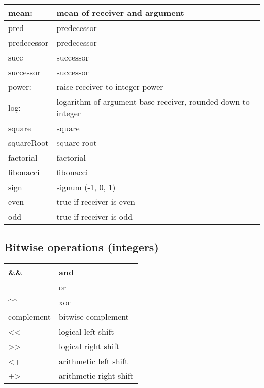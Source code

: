 \documentclass[letterpaper,10pt,english]{sphinxmanual}
\begin{document}
\begin{longtable}{p{5cm} p{10cm}}
\\
\hline
mean:
&
mean of receiver and argument
\\
\hline
pred
&
predecessor
\\
\hline
predecessor
&
predecessor
\\
\hline
succ
&
successor
\\
\hline
successor
&
successor
\\
\hline
power:
&
raise receiver to integer power
\\
\hline
log:
&
logarithm of argument base receiver, rounded down to integer
\\
\hline
square
&
square
\\
\hline
squareRoot
&
square root
\\
\hline
factorial
&
factorial
\\
\hline
fibonacci
&
fibonacci
\\
\hline
sign
&
signum (-1, 0, 1)
\\
\hline
even
&
true if receiver is even
\\
\hline
odd
&
true if receiver is odd
\\
\hline\end{longtable}



\subsection{Bitwise operations (integers)}
\label{\detokenize{usefulselectors:bitwise-operations-integers}}
\noindent\begin{tabulary}{\linewidth}{p{5cm} p{10cm}}
\hline

\&\&
&
and
\\
\hline
\textbar{}\textbar{}
&
or
\\
\hline
\textasciicircum{}\textasciicircum{}
&
xor
\\
\hline
complement
&
bitwise complement
\\
\hline
\textless{}\textless{}
&
logical left shift
\\
\hline
\textgreater{}\textgreater{}
&
logical right shift
\\
\hline
\textless{}+
&
arithmetic left shift
\\
\hline
+\textgreater{}
&
arithmetic right shift
\\
\hline\end{tabulary}
\end{document}

